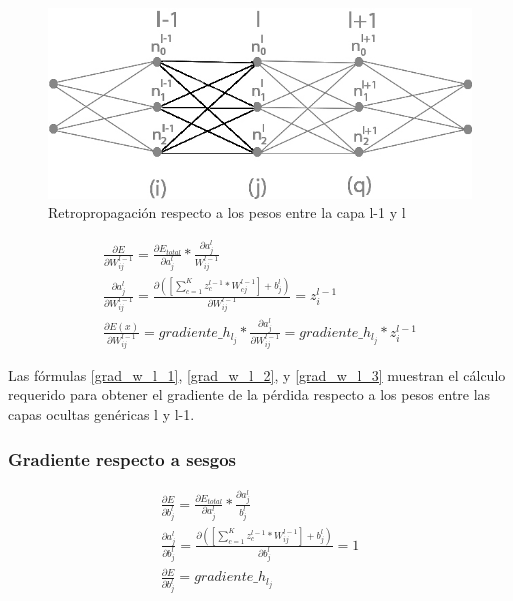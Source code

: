 \begin{figure}[H]
	\centering
	\includegraphics[scale=0.35]{imagenes/conclusion_pesos.jpg}  
	\caption{Retropropagación respecto a los pesos entre la capa l-1 y l}
	\label{fig:conclusion_pesos}
\end{figure}

\begin{gather}
	\frac{\partial E}{\partial W^{l-1}_{ij}} = \frac{\partial E_{total} }{\partial a^l_j } * \frac{\partial a^l_j}{W^{l-1}_{ij}} \label{grad_w_l_1} \\
	\frac{\partial a^l_j }{\partial W^{l-1}_{ij} } = \frac{\partial ([\sum_{c=1}^{K} z^{l-1}_c * W^{l-1}_{cj}] + b^l_j)}{\partial W^{l-1}_{ij} } = z^{l-1}_i \label{grad_w_l_2} \\
	\frac{\partial E(x) }{\partial W^{l-1}_{ij} } = gradiente\_h_{l_j} * \frac{\partial a^l_j }{\partial W^{l-1}_{ij} } = gradiente\_h_{l_j} * z^{l-1}_i \label{grad_w_l_3}
\end{gather}

Las fórmulas \ref{grad_w_l_1}, \ref{grad_w_l_2}, y \ref{grad_w_l_3} muestran el cálculo requerido para obtener el gradiente de la pérdida respecto a los pesos entre las capas ocultas genéricas l y l-1.

\subsubsection{Gradiente respecto a sesgos}

\begin{gather}
	\frac{\partial E}{\partial b^l_j} = \frac{\partial E_{total} }{\partial a^l_j } * \frac{\partial a^l_j}{b^l_j} \label{grad_b_l_1} \\
	\frac{\partial a^l_j }{\partial b^l_j } = \frac{\partial ([\sum_{c=1}^{K} z^{l-1}_c * W^{l-1}_{ij}] + b^l_j) }{\partial b^l_j } = 1 \label{grad_b_l_2} \\
	\frac{\partial E}{\partial b^l_j} = gradiente\_h_{l_j} \label{grad_b_l_3}
\end{gather}

